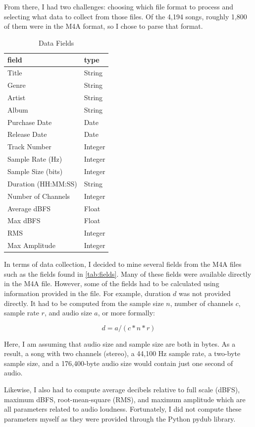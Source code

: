 \documentclass[journal]{vgtc}                %
\begin{document}
From there, I had two challenges: choosing which file format to process and
selecting what data to collect from those files. Of the 4,194 songs, roughly
1,800 of them were in the M4A format, so I chose to parse that format.

\begin{table}[h]
  \caption{Data Fields}
  \label{tab:fields}
  \scriptsize%
	\centering%
  \begin{tabu}{l l}
  \toprule
    field & type \\
  \midrule
  Title & String \\
  Genre & String \\
  Artist & String \\
  Album & String \\
  Purchase Date & Date \\
  Release Date & Date \\
  Track Number & Integer \\
  Sample Rate (Hz) & Integer \\
  Sample Size (bits) & Integer \\
  Duration (HH:MM:SS) & String \\
  Number of Channels & Integer \\
  Average dBFS & Float \\
  Max dBFS & Float \\
  RMS & Integer \\
  Max Amplitude & Integer \\
  \midrule
  \end{tabu}%
\end{table}

In terms of data collection, I decided to mine several fields from the M4A files
such as the fields found in \autoref{tab:fields}. Many of these fields were
available directly in the M4A file. However, some of the fields had to be
calculated using information provided in the file. For example, duration $d$ was
not provided directly. It had to be computed from the sample size $n$, number of
channels $c$, sample rate $r$, and audio size $a$, or more formally:

\[ d = a / (c * n * r) \]

Here, I am assuming that audio size and sample size are both in bytes. As a
result, a song with two channels (stereo), a 44,100 Hz sample rate, a two-byte
sample size, and a 176,400-byte audio size would contain just one second of
audio.

Likewise, I also had to compute average decibels relative to full scale (dBFS),
maximum dBFS, root-mean-square (RMS), and maximum amplitude which are all
parameters related to audio loudness. Fortunately, I did not compute these
parameters myself as they were provided through the Python pydub library.
\end{document}
